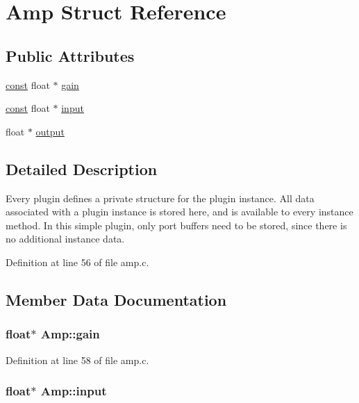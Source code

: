 \hypertarget{struct_amp}{}\section{Amp Struct Reference}
\label{struct_amp}
\subsection*{Public Attributes}
\begin{DoxyCompactItemize}
\item 
\hyperlink{getopt1_8c_a2c212835823e3c54a8ab6d95c652660e}{const} float $\ast$ \hyperlink{struct_amp_a46cf321782b77cddaf875e34e9a98a1b}{gain}
\item 
\hyperlink{getopt1_8c_a2c212835823e3c54a8ab6d95c652660e}{const} float $\ast$ \hyperlink{struct_amp_ae8cc1281501c01f2184d5cd9427320f1}{input}
\item 
float $\ast$ \hyperlink{struct_amp_a098d44d8c4cbdac5329fbc890632ad22}{output}
\end{DoxyCompactItemize}


\subsection{Detailed Description}
Every plugin defines a private structure for the plugin instance. All data associated with a plugin instance is stored here, and is available to every instance method. In this simple plugin, only port buffers need to be stored, since there is no additional instance data. 

Definition at line 56 of file amp.\+c.



\subsection{Member Data Documentation}
\subsubsection[{\texorpdfstring{gain}{gain}}]{ float$\ast$ Amp\+::gain}\hypertarget{struct_amp_a46cf321782b77cddaf875e34e9a98a1b}{}\label{struct_amp_a46cf321782b77cddaf875e34e9a98a1b}


Definition at line 58 of file amp.\+c.

\subsubsection[{\texorpdfstring{input}{input}}]{ float$\ast$ Amp\+::input}\hypertarget{struct_amp_ae8cc1281501c01f2184d5cd9427320f1}{}\label{struct_amp_ae8cc1281501c01f2184d5cd9427320f1}


